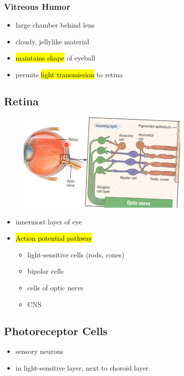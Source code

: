 \documentclass[a4paper,12pt]{article}
\begin{document}
\subsubsection{Vitreous Humor}
\begin{itemize}
    \item{large chamber behind lens}
    \item{cloudy, jellylike material}
    \item{\hl{maintains shape} of eyeball}
    \item{permits \hl{light transmission} to retina}
\end{itemize}

\subsection{Retina}
\begin{figure}[H]
    \centering
    \includegraphics[width=0.75\textwidth]{retina}
\end{figure}
\begin{itemize}
    \item{innermost layer of eye}
    \item{
            \hl{Action potential pathway}
            \begin{itemize}
                \item{light-sensitive cells (rods, cones)}
                \item{bipolar cells}
                \item{cells of optic nerve}
                \item{CNS}
            \end{itemize}
        }
\end{itemize}

\subsection{Photoreceptor Cells}
\begin{itemize}
    \item{sensory neurons}
    \item{in light-sensitive layer, next to choroid layer}
\end{itemize}
\end{document}

